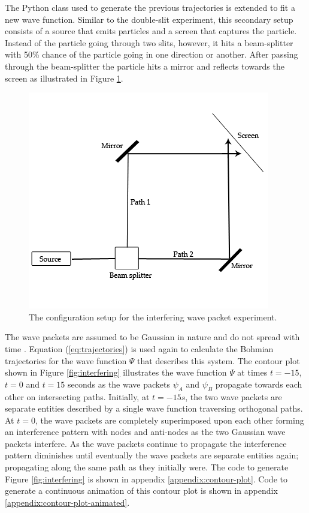 \documentclass[10pt, reqno]{article}
\begin{document}
  The Python class used to generate the previous trajectories is extended to fit a new wave function.
  Similar to the double-slit experiment, this secondary setup consists of a source that emits particles and a screen that captures the particle.
  Instead of the particle going through two slits, however, it hits a beam-splitter with 50\% chance of the particle going
    in one direction or another.
  After passing through the beam-splitter the particle hits a mirror and reflects towards the screen as illustrated in Figure \ref{fig:interfering-setup}.

  \begin{figure}[!ht]
    \centerline{\includegraphics[scale=.6]{./imgs/secondary-setup.png}}
    \caption{
      The configuration setup for the interfering wave packet experiment.
    }
    \label{fig:interfering-setup}
  \end{figure}

  The wave packets are assumed to be Gaussian in nature and do not spread with time \cite{chaloupka}.
  Equation (\ref{eq:trajectories}) is used again to calculate the Bohmian trajectories for the wave function $\Psi$ that describes this system.
  The contour plot shown in Figure \ref{fig:interfering} illustrates the wave function $\Psi$ at times $t=-15$, $t=0$ and $t=15$ seconds 
    as the wave packets $\psi_A$ and $\psi_B$ propagate towards each other on intersecting paths.
  Initially, at $t=-15s$, the two wave packets are separate entities described by a single wave function traversing orthogonal paths.
  At $t=0$, the wave packets are completely superimposed upon each other forming an interference pattern with nodes and anti-nodes as the two Gaussian wave packets interfere.
  As the wave packets continue to propagate the interference pattern diminishes until eventually the wave packets are separate entities again;
    propagating along the same path as they initially were.
  The code to generate Figure \ref{fig:interfering} is shown in appendix \ref{appendix:contour-plot}.
  Code to generate a continuous animation of this contour plot is shown in appendix \ref{appendix:contour-plot-animated}.
\end{document}
